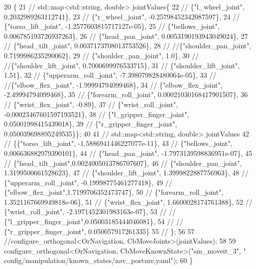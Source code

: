 \begin{DoxyCode}
20     \{
21     \textcolor{comment}{//    std::map<std::string, double> jointValues\{}
22     \textcolor{comment}{//         \{"l\_wheel\_joint", 0.2032989263112741\},}
23     \textcolor{comment}{//         \{"r\_wheel\_joint", -0.25798452342087597\},}
24     \textcolor{comment}{//         \{"torso\_lift\_joint", -1.2577603815717127e-05\},}
25     \textcolor{comment}{//         \{"bellows\_joint", 0.006785193726937263\},}
26     \textcolor{comment}{//         \{"head\_pan\_joint", 0.0053190193943049024\},}
27     \textcolor{comment}{//         \{"head\_tilt\_joint", 0.0037173708013753526\},}
28     \textcolor{comment}{//         //\{"shoulder\_pan\_joint", 0.7199986235290062\},}
29     \textcolor{comment}{//         \{"shoulder\_pan\_joint", 1.0\},}
30     \textcolor{comment}{//         //\{"shoulder\_lift\_joint", 0.7000699976533715\},}
31     \textcolor{comment}{//         \{"shoulder\_lift\_joint", 1.51\},}
32     \textcolor{comment}{//         \{"upperarm\_roll\_joint", -7.398079828480064e-05\},}
33     \textcolor{comment}{//         //\{"elbow\_flex\_joint", -1.99994794099468\},}
34     \textcolor{comment}{//         \{"elbow\_flex\_joint", -2.49994794099468\},}
35     \textcolor{comment}{//         \{"forearm\_roll\_joint", 0.00021030168417901507\},}
36     \textcolor{comment}{//         \{"wrist\_flex\_joint", -0.89\},}
37     \textcolor{comment}{//         \{"wrist\_roll\_joint", -0.00023467601597193521\},}
38     \textcolor{comment}{//         \{"l\_gripper\_finger\_joint", 0.05001998415439018\},}
39     \textcolor{comment}{//         \{"r\_gripper\_finger\_joint", 0.050039698895249535\}\};}
40 
41     \textcolor{comment}{//  std::map<std::string, double> jointValues}
42     \textcolor{comment}{//    \{\{"torso\_lift\_joint", -1.5886941446227077e-11\},}
43     \textcolor{comment}{//     \{"bellows\_joint", 0.006636882979390101\},}
44     \textcolor{comment}{//     \{"head\_pan\_joint", -1.7973139598836951e-07\},}
45     \textcolor{comment}{//     \{"head\_tilt\_joint",0.0024005013786707607\},}
46     \textcolor{comment}{//     \{"shoulder\_pan\_joint", 1.3199500661528623\},}
47     \textcolor{comment}{//     \{"shoulder\_lift\_joint", 1.3999822887756963\},}
48     \textcolor{comment}{//     \{"upperarm\_roll\_joint", -0.19998775461277418\},}
49     \textcolor{comment}{//     \{"elbow\_flex\_joint",1.7199706352473747\},}
50     \textcolor{comment}{//     \{"forearm\_roll\_joint", 1.3521167669949818e-06\},}
51     \textcolor{comment}{//     \{"wrist\_flex\_joint", 1.6600028174761388\},}
52     \textcolor{comment}{//     \{"wrist\_roll\_joint", -2.1971452301983163e-07\},}
53     \textcolor{comment}{//     // \{"l\_gripper\_finger\_joint",0.05003185444046081\},}
54     \textcolor{comment}{//     // \{"r\_gripper\_finger\_joint", 0.050057917261335\}}
55     \textcolor{comment}{//     \};}
56 
57         \textcolor{comment}{//configure\_orthogonal<OrNavigation, CbMoveJoints>(jointValues);}
58 
59         configure\_orthogonal<OrNavigation, CbMoveKnownState>(\textcolor{stringliteral}{"sm\_moveit\_3"}, \textcolor{stringliteral}{"
      config/manipulation/known\_states/nav\_posture.yaml"});
60     \}
\end{DoxyCode}


